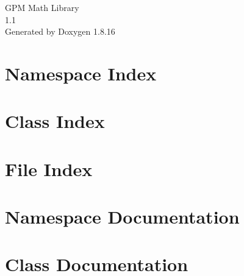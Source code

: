 \let\mypdfximage\pdfximage\def\pdfximage{\immediate\mypdfximage}\documentclass[twoside]{book}
\newcommand{\+}{\discretionary{\mbox{\scriptsize$\hookleftarrow$}}{}{}}
\newcommand{\clearemptydoublepage}{%
  \newpage{\pagestyle{empty}\cleardoublepage}%
}
\begin{document}
\hypersetup{pageanchor=false,
             bookmarksnumbered=true,
             pdfencoding=unicode
            }
\begin{titlepage}
\vspace*{7cm}
\begin{center}%
{\Large G\+PM Math Library \\[1ex]\large 1.\+1 }\\
\vspace*{1cm}
{\large Generated by Doxygen 1.8.16}\\
\end{center}
\end{titlepage}
\clearemptydoublepage
{}
\tableofcontents
\clearemptydoublepage
{}
\hypersetup{pageanchor=true}

\chapter{Namespace Index}

\chapter{Class Index}

\chapter{File Index}

\chapter{Namespace Documentation}


\chapter{Class Documentation}








\end{document}
